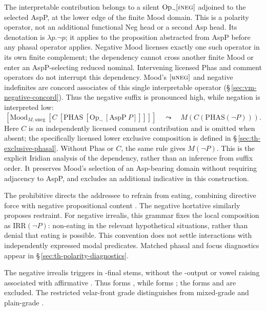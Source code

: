 The interpretable contribution belongs to a silent
$\mathrm{Op}_{\neg}[i\textsc{neg}]$ adjoined to the selected AspP, at the
lower edge of the finite Mood domain. This is a polarity operator, not an
additional functional Neg head or a second Asp head. Its denotation is
$\lambda p.\neg p$; it applies to the proposition abstracted from AspP
before any phasal operator applies. Negative Mood licenses exactly one such
operator in its own finite complement; the dependency cannot cross another
finite Mood or enter an AspP-selecting reduced nominal. Intervening licensed
Phas and comment operators do not interrupt this dependency. Mood's
$[u\textsc{neg}]$ and negative indefinites are concord associates of this
single interpretable operator (§\,\ref{sec:vm-negative-concord}). Thus the
negative suffix is pronounced high, while negation is interpreted low:
\[
 [\mathrm{Mood}_{M,u\mathrm{neg}}\ [C\ [\mathrm{PHAS}\
   [\mathrm{Op}_{\neg}\ [\mathrm{AspP}\ P]]]]]
 \quad\leadsto\quad M(C(\mathrm{PHAS}(\neg P))).
\]
Here $C$ is an independently licensed comment contribution and is omitted
when absent; the specifically licensed lower exclusive composition is defined
in §\,\ref{sec:th-exclusive-phasal}. Without Phas or $C$, the same rule gives
$M(\neg P)$. This is the explicit Iridian analysis of the dependency, rather
than an inference from suffix order. It preserves Mood's selection of an
Asp-bearing domain without requiring adjacency to AspP, and excludes an
additional indicative \ird{za-} in this construction.

The prohibitive   directs the
addressee to refrain from eating, combining directive force with negative
propositional content \cite{han2001}. The negative hortative similarly
proposes restraint. For negative irrealis, this grammar fixes the local
composition as $\mathrm{IRR}(\neg P)$: non-eating in the relevant hypothetical
situations, rather than denial that eating is possible. This convention does
not settle interactions with independently expressed modal predicates.
Matched phasal and focus diagnostics appear in
§\,\ref{sec:th-polarity-diagnostics}.

The negative irrealis  triggers  in
\ird{k}-final stems, without the \ird{č}-output or vowel raising associated
with affirmative \ird{-ěv}. Thus \ird{zděk-} \trsl{bring} forms
, while  forms ; the forms
\ird{*zděkir} and \ird{*zďíčir} are excluded. The restricted velar-front
grade distinguishes \ird{-ir} from mixed-grade \ird{-ěv} and plain-grade
\ird{-ej}.

